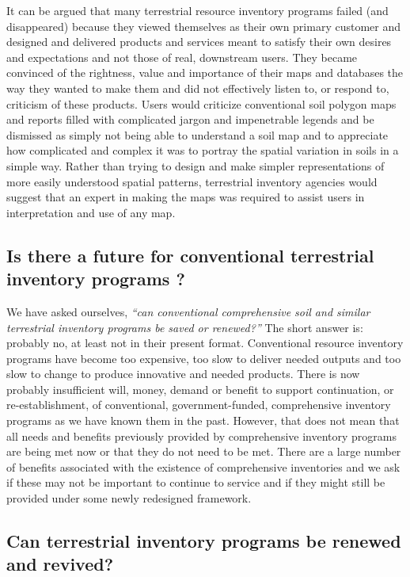 \documentclass[graybox,natbib,nospthms,UStrade]{svmono}
\begin{document}
It can be argued that many terrestrial resource inventory programs
failed (and disappeared) because they viewed themselves as their own
primary customer and designed and delivered products and services meant
to satisfy their own desires and expectations and not those of real,
downstream users. They became convinced of the rightness, value and
importance of their maps and databases the way they wanted to make them
and did not effectively listen to, or respond to, criticism of these
products. Users would criticize conventional soil polygon maps and
reports filled with complicated jargon and impenetrable legends and be
dismissed as simply not being able to understand a soil map and to
appreciate how complicated and complex it was to portray the spatial
variation in soils in a simple way. Rather than trying to design and
make simpler representations of more easily understood spatial patterns,
terrestrial inventory agencies would suggest that an expert in making
the maps was required to assist users in interpretation and use of any
map.

\hypertarget{is-there-a-future-for-conventional-terrestrial-inventory-programs}{%
\subsection{Is there a future for conventional terrestrial inventory programs ?}\label{is-there-a-future-for-conventional-terrestrial-inventory-programs}}

We have asked ourselves, \emph{``can conventional comprehensive soil and similar terrestrial inventory programs be saved or renewed?''}
The short answer is: probably no, at least not in their present format.
Conventional resource inventory programs have become too expensive, too
slow to deliver needed outputs and too slow to change to produce
innovative and needed products. There is now probably insufficient will,
money, demand or benefit to support continuation, or re-establishment,
of conventional, government-funded, comprehensive inventory programs as
we have known them in the past. However, that does not mean that all
needs and benefits previously provided by comprehensive inventory
programs are being met now or that they do not need to be met. There are
a large number of benefits associated with the existence of
comprehensive inventories and we ask if these may not be important to
continue to service and if they might still be provided under some newly
redesigned framework.

\hypertarget{can-terrestrial-inventory-programs-be-renewed-and-revived}{%
\subsection{Can terrestrial inventory programs be renewed and revived?}\label{can-terrestrial-inventory-programs-be-renewed-and-revived}}
\end{document}
